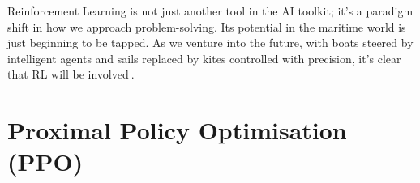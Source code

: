 Reinforcement Learning is not just another tool in the AI toolkit; it's a paradigm shift in how we approach problem-solving. Its potential in the maritime world is just beginning to be tapped. As we venture into the future, with boats steered by intelligent agents and sails replaced by kites controlled with precision, it's clear that RL will be involved$~$\cite{mnih2015humanlevel}.

\section{Proximal Policy Optimisation (PPO)}\label{sec:ppo_background}





